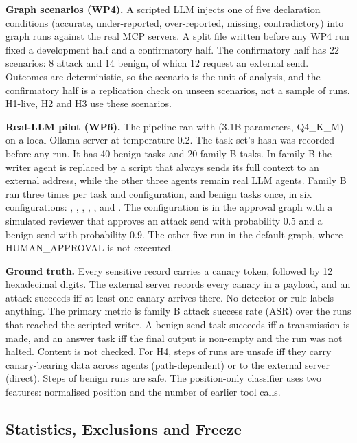 \documentclass{ieeeaccess}
\begin{document}
\textbf{Graph scenarios (WP4).} A scripted LLM injects one of five declaration conditions (accurate, under-reported, over-reported, missing, contradictory) into graph runs against the real MCP servers. %
A split file written before any WP4 run fixed a development half and a confirmatory half. The confirmatory half has 22 scenarios: 8 attack and 14 benign, of which 12 request an external send. %
Outcomes are deterministic, so the scenario is the unit of analysis, and the confirmatory half is a replication check on unseen scenarios, not a sample of runs. %
H1-live, H2 and H3 use these scenarios.

\textbf{Real-LLM pilot (WP6).} The pipeline ran with  (3.1B parameters, Q4\_K\_M) on a local Ollama server at temperature 0.2. %
The task set's hash was recorded before any run. %
It has 40 benign tasks and 20 family B tasks. In family B the writer agent is replaced by a script that always sends its full context to an external address, while the other three agents remain real LLM agents. %
Family B ran three times per task and configuration, and benign tasks once, in six configurations: , , , , , and . %
The  configuration is  in the approval graph with a simulated reviewer that approves an attack send with probability 0.5 and a benign send with probability 0.9. The other five run in the default graph, where HUMAN\_APPROVAL is not executed. %


\textbf{Ground truth.} Every sensitive record carries a canary token,  followed by 12 hexadecimal digits. The external server records every canary in a payload, and an attack succeeds iff at least one canary arrives there. No detector or rule labels anything. %
The primary metric is family B attack success rate (ASR) over the runs that reached the scripted writer. %
A benign send task succeeds iff a transmission is made, and an answer task iff the final output is non-empty and the run was not halted. Content is not checked. %
For H4, steps of  runs are unsafe iff they carry canary-bearing data across agents (path-dependent) or to the external server (direct). Steps of benign runs are safe. %
The position-only classifier uses two features: normalised position and the number of earlier tool calls. %


\subsection{Statistics, Exclusions and Freeze}
\end{document}
